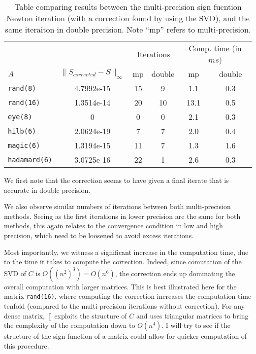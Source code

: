\documentclass[10pt, A4paper]{article}
\begin{document}
\begin{table}[t]
	\centering
	\begin{tabular}{lccccc}
		\toprule
		& & \multicolumn{2}{c}{Iterations} & \multicolumn{2}{c}{Comp. 
		time (in $ms$)} \\
		\cmidrule(lr){3-4} \cmidrule(lr){5-6}
		$A$ & $\|S_{corrected} - S\|_\infty$ & mp & double & mp & 
		double 
		\\
		\midrule
		\texttt{rand(8)}     & 4.7992e-15 & 15 & 9  & 1.1  & 0.3 \\
		\texttt{rand(16)}    & 1.3514e-14 & 20 & 10 & 13.1 & 0.5 \\
		\texttt{eye(8)}      & 0          & 0  & 0  & 2.1  & 0.3 \\
		\texttt{hilb(6)}     & 2.0624e-19 & 7  & 7  & 2.0  & 0.4 \\
		\texttt{magic(6)}    & 1.3194e-15 & 11 & 7  & 1.3  & 1.6 \\
		\texttt{hadamard(6)} & 3.0725e-16 & 22 & 1  & 2.6  & 0.3 \\
		\bottomrule
	\end{tabular}
	\caption{
		\label{tab:LSQCorrectionMultiSign}
		Table comparing results between the multi-precision sign 
		fucntion Newton iteration (with a correction found by using the 
		SVD), and the same iteraiton in double precision.
		Note ``mp'' refers to multi-precision.
	}
\end{table}

We first note that the correction seems to have given a final 
iterate that is accurate in double precision.

We also observe similar numbers of iterations between both
multi-precision methods.
Seeing as the first iterations in lower precision are the same for both 
methods, this again relates to the convergence condition in low and 
high precision, which need to be loosened to avoid excess iterations.

Most importantly, we witness a significant increase in the computation 
time, due to the time it takes to compute the correction. Indeed, since 
comutation of the SVD of $C$ is $O((n^2)^3) = O(n^6)$, the correction 
ends up dominating the overall computation with larger matrices. This 
is best illustrated here for the matrix \texttt{rand(16)}, where 
computing the correction increases the computation time tenfold 
(compared to the multi-precision iterations without correction).
For any dense matrix,~[\citealp{zhzh1997}] exploits the structure of 
$C$ and 
uses triangular matrices to bring the complexity of the computation 
down to $O(n^4)$.
I will try to see if the structure of the sign function of a matrix 
could allow for quicker computation of this procedure.
\end{document}
